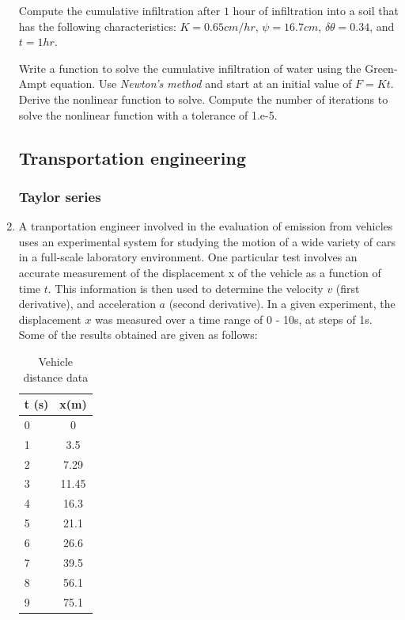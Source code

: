 \documentclass[a4paper,12pt]{article}
\begin{document}
\begin{enumerate}
	Compute the cumulative infiltration after $1$ hour of infiltration into a soil that has the following characteristics: $K = 0.65 cm/hr$, $\psi = 16.7 cm$, $\delta\theta = 0.34$, and $t = 1 hr$.
	
	Write a function to solve the cumulative infiltration of water using the Green-Ampt equation. Use \textit{Newton's method} and start at an initial value of $F = Kt$. Derive the nonlinear function to solve. Compute the number of iterations to solve the nonlinear function with a tolerance of 1.e-5.
 	
 	\subsection*{Transportation engineering}
 	\subsubsection*{Taylor series}
 	\item A tranportation engineer involved in the evaluation of emission from vehicles uses an experimental system for studying the motion of a wide variety of cars in a full-scale laboratory environment. One particular test involves an accurate measurement of the displacement x of the vehicle as a function of time $t$. This information is then used to determine the velocity $v$ (first derivative), and acceleration $a$ (second derivative). In a given experiment, the displacement $x$ was measured over a time range of 0 - 10s, at steps of 1s. Some of the results obtained are given as follows:
 	
	\begin{table}[!h]
		\centering
 		\begin{tabular}{l c}
 			\toprule
 			\textbf{t (s)} & x(m) \\
 			\midrule
 			0 &	0 \\
 			1 &	3.5 \\
 			2 &	7.29 \\
 			3 &	11.45 \\
 			4 &	16.3 \\
 			5 &	21.1 \\
 			6 &	26.6 \\
 			7 &	39.5 \\
 			8 &	56.1 \\
 			9 &	75.1 \\
 			\bottomrule
 		\end{tabular}
		\caption{Vehicle distance data}
	 	\label{table:traffic}
	 \end{table}
 

\end{enumerate}
\end{document}
